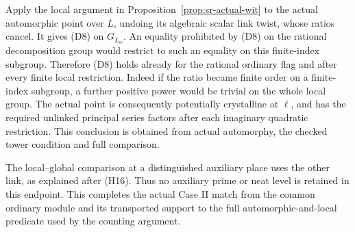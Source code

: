 Apply the local argument in
Proposition~\ref{prop:sr-actual-wit} to the actual
automorphic point over \(L\), undoing its algebraic
scalar link twist, whose ratios cancel.
It gives (D8) on \(G_{L_w}\).
An equality prohibited by (D8) on the rational
decomposition group would restrict to such an equality
on this finite-index subgroup.
Therefore (D8) holds already for the rational ordinary
flag and after every finite local restriction.
Indeed if the ratio became finite order on a
finite-index subgroup, a further positive power would
be trivial on the whole local group.
The actual point is consequently potentially crystalline
at \(\ell\), and has the required unlinked principal
series factors after each imaginary quadratic restriction.
This conclusion is obtained from actual automorphy,
the checked tower condition and full comparison.

The local--global comparison at a distinguished auxiliary
place uses the other link, as explained after (H16).
Thus no auxiliary prime or neat level is retained in this
endpoint.
This completes the actual Case II match from the common
ordinary module and its transported support to the full
automorphic-and-local predicate used by the counting
argument.

